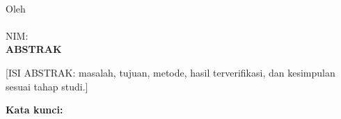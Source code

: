 \clearpage
{}
{}
\begin{center}
\textbf{\large\judulid}\\[0.5cm]
Oleh\\
\penulis\\
NIM: \nim\\[2em]
\textbf{ABSTRAK}\\[0.5cm]
\end{center}
[ISI ABSTRAK: masalah, tujuan, metode, hasil terverifikasi, dan kesimpulan sesuai tahap studi.]

\vspace{0.6cm}
\noindent\textbf{Kata kunci:} \katakunci
